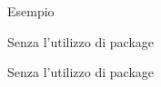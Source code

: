 \begin{frame}[fragile]{Esempio}

\begin{exampleblock}{Senza l'utilizzo di package}
	
\end{exampleblock}

\pause

\begin{exampleblock}{Senza l'utilizzo di package}
	
\end{exampleblock}

\end{frame}